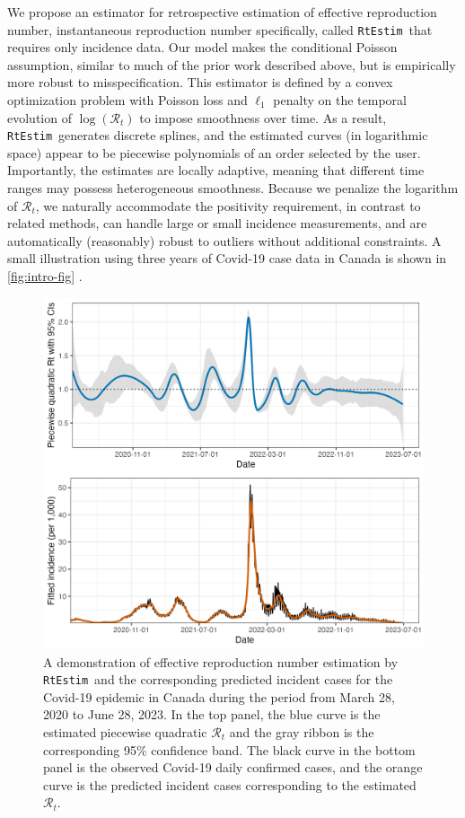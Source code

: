 \documentclass[10pt,letterpaper]{article}
\def\RtEstim{\texttt{RtEstim}}
\def\calR{\mathcal{R}}
\newcommand{\citep}[1]{\cite{#1}}
\begin{document}
We propose an estimator for retrospective estimation of effective reproduction number, 
instantaneous reproduction number specifically,  
called \RtEstim\ that requires only incidence data. Our model makes the
conditional Poisson assumption, similar to much of the prior work described
above, but is empirically more robust to misspecification. This estimator is 
defined by a convex optimization problem with Poisson loss and $\ell_1$ penalty 
on the temporal evolution of $\log(\calR_t)$ to impose smoothness over time. 
As a result, \RtEstim\ generates discrete splines, and the estimated curves (in
logarithmic space) appear to be piecewise polynomials of an order selected by the
user. Importantly, the estimates are locally adaptive, meaning that different
time ranges may possess heterogeneous smoothness. Because we penalize the
logarithm of $\calR_t$, we naturally accommodate the positivity requirement, in
contrast to related methods, can
handle large or small incidence measurements, and are automatically (reasonably)
robust to outliers without additional constraints. A small illustration using
three years of Covid-19 case data in Canada is shown in \autoref{fig:intro-fig} 
\citep{CovidTimelineCanada}.

\begin{figure}[!ht]
  \centering
  \includegraphics[width=.9\textwidth]{fig/intro-fig-new.png}
  \caption{A demonstration of effective reproduction number estimation 
  by \RtEstim\ and the corresponding predicted incident cases for the Covid-19 epidemic 
  in Canada during the period from March 28, 2020 to June 28, 2023. 
  In the top panel, the blue curve is the estimated piecewise
  quadratic $\calR_t$ and the gray ribbon is the corresponding 95\% confidence band. 
  The black curve in the bottom panel is the observed Covid-19 daily confirmed 
  cases, and the orange curve is the predicted incident cases
  corresponding to the estimated $\calR_t$.}
  \label{fig:intro-fig}
\end{figure}
\end{document}
